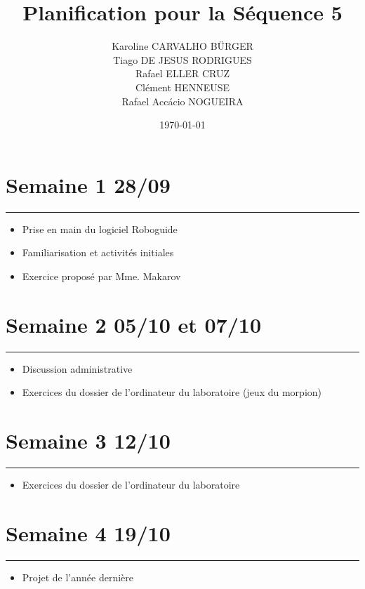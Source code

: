 \documentclass[11pt,a4paper,onecolumn]{articlewithlogo}
\title{Planification pour la Séquence 5}
\author{Karoline CARVALHO BÜRGER\\ Tiago DE JESUS RODRIGUES\\  Rafael ELLER CRUZ \\ Clément HENNEUSE\\ Rafael Accácio NOGUEIRA }
\date{\today}
\begin{document}
\maketitle
\section*{Semaine 1 \footnotesize{28/09}}
\hrule
\vspace{3mm} 

\begin{itemize}
	\renewcommand\labelitemi{--}
	\item Prise en main du logiciel Roboguide
	\item Familiarisation et activités initiales
	\item Exercice proposé par Mme. Makarov 
\end{itemize}

\section*{Semaine 2 \footnotesize{05/10 et 07/10}}
\hrule
\vspace{3mm}
\begin{itemize}
	\renewcommand\labelitemi{--}
	\item Discussion administrative 
	\item Exercices du dossier de l'ordinateur du laboratoire (jeux du morpion)
\end{itemize}



\section*{Semaine 3 \footnotesize{12/10}}
\hrule

\vspace{3mm}
\begin{itemize}
	\renewcommand\labelitemi{--}
	\item Exercices du dossier de l'ordinateur du laboratoire
\end{itemize}

\section*{Semaine 4 \footnotesize{19/10}}
\hrule

\vspace{3mm}
\begin{itemize}
	\renewcommand\labelitemi{--}
	\item Projet de l'année dernière 
\end{itemize}
\end{document}
